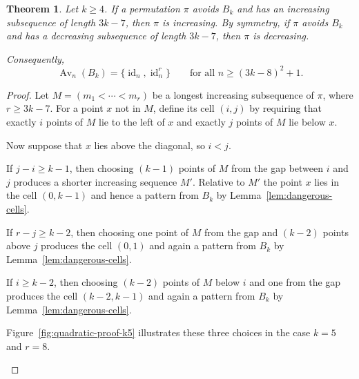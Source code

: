 \documentclass[11pt]{amsart}
\newcommand{\Av}{\operatorname{Av}}
\newcommand{\id}{\operatorname{id}}
\theoremstyle{plain}
\newtheorem{theorem}{Theorem}[section]
\theoremstyle{definition}
\theoremstyle{remark}
\begin{document}
\begin{theorem}\label{thm:quadratic-bound}
  Let $k \geq 4$.  If a permutation $\pi$ avoids $B_k$ and has an increasing subsequence of length
  $3k-7$, then $\pi$ is increasing.  By symmetry, if $\pi$ avoids $B_k$ and has a decreasing
  subsequence of length $3k-7$, then $\pi$ is decreasing.

  Consequently,
  \[
    \Av_n(B_k)=\{\id_n,\id_n^r\}\qquad\text{for all }n \geq (3k-8)^2+1.
  \]
\end{theorem}

\begin{proof}
  Let $M=(m_1<\cdots<m_r)$ be a longest increasing subsequence of $\pi$, where $r \geq 3k-7$.  For a point
  $x$ not in $M$, define its cell $(i,j)$ by requiring that exactly $i$ points of $M$ lie to the left
  of $x$ and exactly $j$ points of $M$ lie below $x$.

  Now suppose that $x$ lies above the diagonal, so $i<j$.

  If $j-i \geq k-1$, then choosing $(k-1)$ points of $M$ from the gap between $i$ and $j$ produces
  a shorter increasing sequence $M'$. Relative to $M'$ the point $x$ lies in the
  cell $(0,k-1)$ and hence a pattern from $B_k$ by Lemma~\ref{lem:dangerous-cells}.

  If $r-j \geq k-2$, then choosing one point of $M$ from the gap and $(k-2)$ points above $j$
  produces the cell $(0,1)$ and again a pattern from $B_k$ by
  Lemma~\ref{lem:dangerous-cells}.

  If $i \geq k-2$, then choosing $(k-2)$ points of $M$ below $i$ and one from the gap produces the
  cell $(k-2,k-1)$ and again a pattern from $B_k$ by
  Lemma~\ref{lem:dangerous-cells}.

  Figure~\ref{fig:quadratic-proof-k5} illustrates these three choices in the case $k=5$ and
  $r=8$.

  \begin{figure}[ht]
    \centering
\end{figure}
\end{proof}
\end{document}
